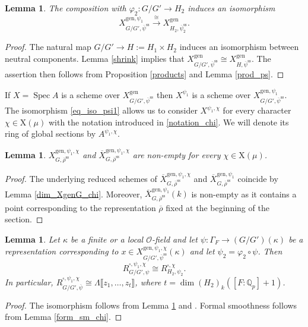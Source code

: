 \documentclass{amsart}
\newtheorem{lem}[prop]{Lemma}
\theoremstyle{definition}
\theoremstyle{remark}
\DeclareMathOperator{\Spec}{Spec}
\newcommand{\Qp}{\mathbb {Q}_p}
\newcommand{\OO}{\mathcal O}
\newcommand{\br}[1]{\llbracket #1\rrbracket}
\newcommand{\rhobar}{\overline{\rho}}
\newcommand{\gen}{\mathrm{gen}}
\newcommand{\Xbar}{\overline{X}}
\newcommand{\rhobarss}{\rhobar^{\mathrm{ss}}}
\newcommand{\psibar}{\overline{\psi}}
\newcommand{\psibarss}{\psibar^{\mathrm {ss}}}
\begin{document}
\begin{lem}\label{DUS} The composition with $\varphi_2: G/G'\rightarrow H_2$ induces an isomorphism 
\begin{equation}\label{eq_iso_psi1}
X^{\gen, \psi_1}_{G/G', \psibarss} \overset{\cong}{\longrightarrow} X^{\gen}_{H_2,\psibarss_2}.
\end{equation}
\end{lem}
\begin{proof} The natural map $G/G'\rightarrow  H:=H_1\times H_2$ induces an isomorphism between neutral components. 
Lemma \ref{shrink} implies that $X^{\gen}_{G/G', \psibarss} \cong X^{\gen}_{H, \psibarss}$. 
The assertion then follows from Proposition \ref{products} and Lemma \ref{prod_ps}.
\end{proof} 
If $X=\Spec A$ is a scheme over $X^{\gen}_{G/G', \psibarss}$ then $X^{\psi_1}$ 
is a scheme over $X^{\gen, \psi_1}_{G/G', \psibarss}$.  The isomorphism 
\eqref{eq_iso_psi1} allows us to consider $X^{\psi_1,\chi}$ for every 
character $\chi\in \mathrm X(\mu)$ with the notation introduced in \eqref{notation_chi}. We will denote its ring of global sections by $A^{\psi_1, \chi}$. 

\begin{lem}\label{non-empty} $X^{\gen, \psi_1, \chi}_{G, \rhobarss}$ and $\Xbar^{\gen, \psi_1, \chi}_{G, \rhobarss}$ are non-empty 
for every $\chi\in \mathrm X(\mu)$.
\end{lem}
\begin{proof} The underlying reduced schemes of $\Xbar^{\gen, \psi_1, \chi}_{G, \rhobarss}$ and $\Xbar^{\gen, \psi_1}_{G, \rhobarss}$
coincide by Lemma \ref{dim_XgenG_chi}. Moreover,  $\Xbar^{\gen, \psi_1}_{G, \rhobarss}(k)$ is non-empty as it contains 
a point corresponding to the representation $\rhobar$ fixed at the beginning of the section. 
\end{proof}


\begin{lem}\label{form_sm} Let $\kappa$ be  a finite or a local $\OO$-field and  
let $\psi: \Gamma_F\rightarrow (G/G')(\kappa)$ be a representation corresponding to $x\in X^{\gen, \psi_1, \chi}_{G/G', \psibarss}(\kappa)$
and let $\psi_2=\varphi_2 \circ \psi$. Then 
$$R^{\square, \psi_1, \chi}_{G/G', \psi} \cong R^{\square,\chi}_{H_2, \psi_2}.$$ 
In particular, $R^{\square, \psi_1, \chi}_{G/G', \psibar}\cong \Lambda\br{z_1,\ldots, z_t}$, where $t=\dim (H_2)_k([F:\Qp]+1)$.
\end{lem}
\begin{proof} The isomorphism follows from Lemma \ref{DUS} and
.  Formal smoothness follows from Lemma \ref{form_sm_chi}.
\end{proof} 
\end{document}
